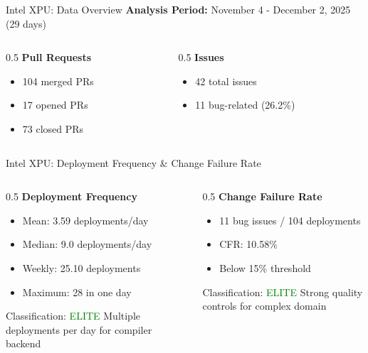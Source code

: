 \documentclass[aspectratio=169]{beamer}
\begin{document}
\begin{frame}{Intel XPU: Data Overview}
  \textbf{Analysis Period:} November 4 - December 2, 2025 (29 days)

  \vspace{0.5cm}
  \begin{columns}
    \begin{column}{0.5\textwidth}
      \textbf{Pull Requests}
      \begin{itemize}
        \item 104 merged PRs
        \item 17 opened PRs
        \item 73 closed PRs
      \end{itemize}
    \end{column}

    \begin{column}{0.5\textwidth}
      \textbf{Issues}
      \begin{itemize}
        \item 42 total issues
        \item 11 bug-related (26.2\%)
      \end{itemize}
    \end{column}
  \end{columns}
\end{frame}

\begin{frame}{Intel XPU: Deployment Frequency \& Change Failure Rate}
  \begin{columns}
    \begin{column}{0.5\textwidth}
      \textbf{Deployment Frequency}
      \begin{itemize}
        \item Mean: 3.59 deployments/day
        \item Median: 9.0 deployments/day
        \item Weekly: 25.10 deployments
        \item Maximum: 28 in one day
      \end{itemize}

      \begin{block}{Classification: \textcolor{green}{ELITE}}
        Multiple deployments per day for compiler backend
      \end{block}
    \end{column}

    \begin{column}{0.5\textwidth}
      \textbf{Change Failure Rate}
      \begin{itemize}
        \item 11 bug issues / 104 deployments
        \item CFR: 10.58\%
        \item Below 15\% threshold
      \end{itemize}

      \begin{block}{Classification: \textcolor{green}{ELITE}}
        Strong quality controls for complex domain
      \end{block}
    \end{column}
  \end{columns}
\end{frame}
\end{document}

